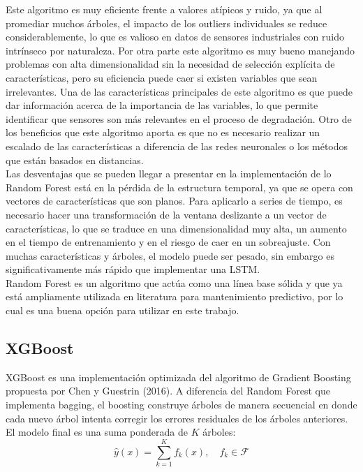 Este algoritmo es muy eficiente frente a valores atípicos y ruido, ya que al promediar muchos árboles, el impacto de los outliers individuales se reduce considerablemente, lo que es valioso en datos de sensores industriales con ruido intrínseco por naturaleza. Por otra parte este algoritmo es muy bueno manejando problemas con alta dimensionalidad sin la necesidad de selección explícita de características, pero su eficiencia puede caer si existen variables que sean irrelevantes. Una de las características principales de este algoritmo es que puede dar información acerca de la importancia de las variables, lo que permite identificar que sensores son más relevantes en el proceso de degradación. Otro de los beneficios que  este algoritmo aporta es que no es necesario realizar un escalado de las características a diferencia de las redes neuronales o los métodos que están basados en distancias.\cite{geron2017}\\[.15cm]

Las desventajas que se pueden llegar a presentar en la implementación de lo Random Forest está en la pérdida de la estructura temporal, ya que se opera con vectores de características que son planos. Para aplicarlo a series de tiempo, es necesario hacer una transformación de la ventana deslizante a un vector de características, lo que se traduce en una dimensionalidad muy alta, un aumento en el tiempo de entrenamiento y en el riesgo de caer en un sobreajuste. Con muchas características y árboles, el modelo puede ser pesado, sin embargo es significativamente más rápido que implementar una LSTM.\\[.15cm]

Random Forest es un algoritmo que actúa como una línea base sólida y que ya está ampliamente utilizada en literatura para mantenimiento predictivo, por lo cual es una buena opción para utilizar en este trabajo.

\subsection{XGBoost}

XGBoost es una implementación optimizada del algoritmo de Gradient Boosting propuesta por Chen y Guestrin (2016)\cite{chen2016}. A diferencia del Random Forest que implementa bagging, el boosting construye árboles de manera secuencial en donde cada  nuevo árbol intenta corregir los errores residuales de los árboles anteriores. El modelo final es una suma ponderada de $K$ árboles:
\[
\hat{y}(x) = \sum_{k=1}^{K} f_k(x), \quad f_k \in \mathcal{F}
\]


